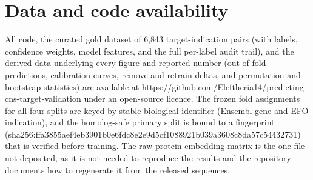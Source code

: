 \documentclass[11pt,twocolumn]{article}
\begin{document}
\section{Data and code availability}

All code, the curated gold dataset of 6,843 target-indication pairs (with labels, confidence weights, model features, and the full per-label audit trail), and the derived data underlying every figure and reported number (out-of-fold predictions, calibration curves, remove-and-retrain deltas, and permutation and bootstrap statistics) are available at https://github.com/Eleftheria14/predicting-cns-target-validation under an open-source licence. The frozen fold assignments for all four splits are keyed by stable biological identifier (Ensembl gene and EFO indication), and the homolog-safe primary split is bound to a fingerprint (sha256:ffa3855aef4eb3901b0e6fdc8e2e9d5cf1088921b039a3608c8da57c54432731) that is verified before training. The raw protein-embedding matrix is the one file not deposited, as it is not needed to reproduce the results and the repository documents how to regenerate it from the released sequences.



\end{document}
